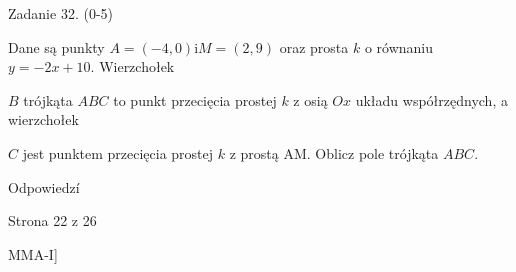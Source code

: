 \documentclass[a4paper,12pt]{article}
\begin{document}
Zadanie 32. (0-5)

Dane są punkty $A=(-4,0) \mathrm{i}M=(2,9)$ oraz prosta $k$ o równaniu $y=-2x+10$. Wierzchołek

$B$ trójkąta $ABC$ to punkt przecięcia prostej $k$ z osią $Ox$ układu współrzędnych, a wierzchołek

$C$ jest punktem przecięcia prostej $k$ z prostą AM. Oblicz pole trójkąta $ABC.$

Odpowiedzí

Strona 22 z 26

MMA-I]
\end{document}
